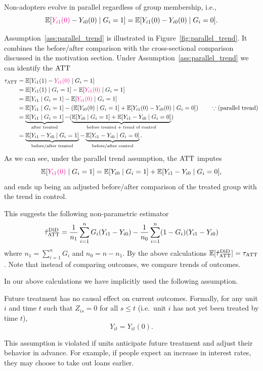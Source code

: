 \documentclass[11pt]{exam}
\begin{document}
\begin{assumption}\label{ass:parallel_trend}
    Non-adopters evolve in parallel regardless of group membership, i.e.,
    \[
    \mathbb{E}[\textcolor{magenta}{Y_{i1}(0)} - Y_{i0}(0) \mid G_i = 1] = \mathbb{E}[Y_{i1}(0) - Y_{i0}(0) \mid G_i = 0].
    \]
\end{assumption}
Assumption~\ref{ass:parallel_trend} is illustrated in Figure~\ref{fig:parallel_trend}. It combines the before/after comparison with the cross-sectional comparison discussed in the motivation section. Under Assumption~\ref{ass:parallel_trend} we can identify the $\mathrm{ATT}$ 
\begin{align*}
     \tau_{\mathrm{ATT}} &= \mathbb{E}[Y_{i1}(1) - \textcolor{magenta}{Y_{i1}(0)} \mid G_i = 1]
     \\
     &= \mathbb{E}[Y_{i1}(1) \mid G_i =1 ] - \mathbb{E}[\textcolor{magenta}{Y_{i1}(0)} \mid G_i = 1]
     \\
     &= \mathbb{E}[Y_{i1} \mid G_i =1 ] - \mathbb{E}[\textcolor{magenta}{Y_{i1}(0)} \mid G_i = 1]
     \\
     &= \mathbb{E}[Y_{i1} \mid G_i = 1] - \left(\mathbb{E}[Y_{i0}(0) \mid G_i = 1] + \mathbb{E}[Y_{i1}(0) - Y_{i0}(0) \mid G_i = 0]\right) \qquad \because \text{(parallel trend)}
     \\
     &= \underbrace{\mathbb{E}[Y_{i1} \mid G_i = 1]}_{\text{after treated}} - (\underbrace{\mathbb{E}[Y_{i0} \mid G_i = 1] + \mathbb{E}[Y_{i1} - Y_{i0} \mid G_i = 0]}_{\text{before treated + trend of control}})
     \\
     &= \underbrace{\mathbb{E}[Y_{i1} - Y_{i0} \mid G_i = 1]}_{\text{before/after treated}} -  \underbrace{\mathbb{E}[Y_{i1} - Y_{i0} \mid G_i = 0]}_{\text{before/after control}}.
\end{align*}
As we can see, under the parallel trend assumption, the $\mathrm{ATT}$ imputes 
\[
    \mathbb{E}[\textcolor{magenta}{Y_{i1}(0)} \mid G_i = 1] = \mathbb{E}[Y_{i0} \mid G_i = 1] + \mathbb{E}[Y_{i1} - Y_{i0} \mid G_i = 0],
\]
and ends up being an adjusted before/after comparison of the treated group with the trend in control.

This suggests the following non-parametric estimator
\[
    \hat \tau^{\mathrm{DiD}}_{\mathrm{ATT}} = \frac{1}{n_1} \sum_{i=1}^n G_i (Y_{i1} - Y_{i0}) - \frac{1}{n_0} \sum_{i=1}^n (1- G_i) (Y_{i1} - Y_{i0})
\]
where $n_1 = \sum_{i=1}^n G_i$ and $n_0 = n - n_1$. By the above calculations $\mathbb{E}[\hat \tau^{\mathrm{DiD}}_{\mathrm{ATT}}] = \tau_{\mathrm{ATT}}$. Note that instead of comparing outcomes, we compare trends of outcomes.

In our above calculations we have implicitly used the following assumption.
\begin{assumption}[No Anticipation]\label{ass:no_anticipation}
Future treatment has no causal effect on current outcomes. Formally, for any
unit $i$ and time $t$ such that $Z_{is} = 0$ for all $s \le t$ (i.e.\ unit $i$
has not yet been treated by time $t$),
\[
  Y_{it} = Y_{it}(0).
\]
\end{assumption}
This assumption is violated if units anticipate future treatment and adjust
their behavior in advance. For example, if people expect an increase in
interest rates, they may choose to take out loans earlier.
\end{document}
